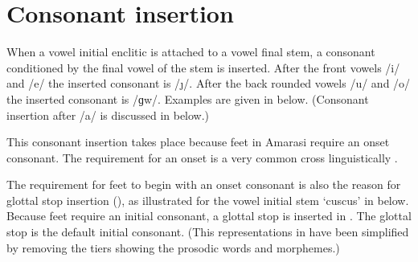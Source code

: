 \section{Consonant insertion}\label{sec:ConIns}
When a vowel initial enclitic is attached to a vowel final stem,
a consonant conditioned by the final vowel of the stem is inserted.
After the front vowels /i/ and /e/ the inserted consonant is /\j/.
After the back rounded vowels /u/ and /o/ the inserted consonant is /ɡw/.
Examples are given in  below.
(Consonant insertion after /a/ is discussed in  below.)

\begin{exe}
	 \label{ex:VV->VVC=V}
\end{exe}

This consonant insertion takes place because
feet in Amarasi require an onset consonant.
The requirement for an onset is a very common cross linguistically \citep{mcpr93,prsm93}.

The requirement for feet to begin with an onset consonant
is also the reason for glottal stop insertion (),
as illustrated for the vowel initial stem  `cuscus' in  below.
Because feet require an initial consonant, a glottal stop is inserted in .
The glottal stop is the default initial consonant.
(This representations in 
have been simplified by removing the tiers showing
the prosodic words and morphemes.)

